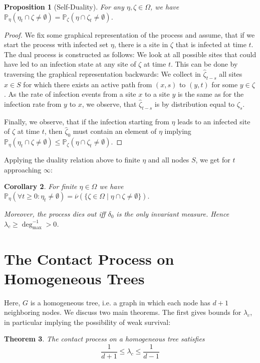 \documentclass[a4paper,11pt]{amsart}
\theoremstyle{theorem}
\newtheorem{theorem}{Theorem}
\newtheorem{proposition}[theorem]{Proposition}
\newtheorem{corollary}[theorem]{Corollary}
\theoremstyle{definition}
\renewcommand{\P}{\mathbb{P}}
\begin{document}
\begin{proposition}[Self-Duality]
	For any $\eta, \zeta\in \Omega$, we have $\P_\eta(\eta_t \cap \zeta \neq \emptyset) = \P_\zeta(\eta \cap \zeta_t \neq \emptyset)$.
\end{proposition}
\begin{proof}
	We fix some graphical representation of the process and assume, that if we start the process with infected set $\eta$, there is a site in $\zeta$ that is infected at time $t$.
	The dual process is constructed as follows:
	We look at all possible sites that could have led to an infection state at any site of $\zeta$ at time $t$.
	This can be done by traversing the graphical representation backwards:
	We collect in $\hat{\zeta}_{t-s}$ all sites $x\in S$ for which there exists an active path from $(x,s)$ to $(y,t)$ for some $y\in \zeta$.
	As the rate of infection events from a site $x$ to a site $y$ is the same as for the infection rate from $y$ to $x$, we observe, that $\hat{\zeta}_{t-s}$ is by distribution equal to $\zeta_s$.
	
	Finally, we observe, that if the infection starting from $\eta$ leads to an infected site of $\zeta$ at time $t$, then $\hat{\zeta}_0$ must contain an element of $\eta$ implying $\P_\eta(\eta_t \cap \zeta \neq \emptyset) \leq \P_\zeta(\eta \cap \zeta_t \neq \emptyset)$.
\end{proof}
Applying the duality relation above to finite $\eta$ and all nodes $S$, we get for $t$ approaching $\infty$:
\begin{corollary}
For finite $\eta\in\Omega$ we have $\P_\eta(\forall t\geq0: \eta_t\neq\emptyset) = \overline{\nu}(\{ \zeta\in\Omega \mid \eta\cap\zeta\neq\emptyset \}).$

Moreover, the process dies out iff $\delta_0$ is the only invariant measure.
Hence $\lambda_c \geq \deg_{\max}^{-1} > 0$.
\end{corollary}

\section{The Contact Process on Homogeneous Trees}
Here, $G$ is a homogeneous tree, i.e. a graph in which each node has $d+1$ neighboring nodes.
We discuss two main theorems.
The first gives bounds for $\lambda_c$, in particular implying the possibility of weak survival:
\begin{theorem}
	The contact process on a homogeneous tree satisfies
	$$\frac{1}{d+1} \leq \lambda_c \leq \frac{1}{d-1}$$
\end{theorem}
\end{document}
